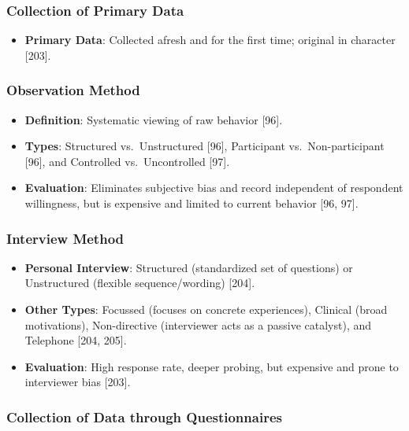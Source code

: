 \documentclass[
]{article}
\providecommand{\tightlist}{%
  \setlength{\itemsep}{0pt}\setlength{\parskip}{0pt}}
\begin{document}
\subsubsection{Collection of Primary
Data}\label{collection-of-primary-data}

\begin{itemize}
\tightlist
\item
  \textbf{Primary Data}: Collected afresh and for the first time;
  original in character {[}203{]}.
\end{itemize}

\subsubsection{Observation Method}\label{observation-method}

\begin{itemize}
\tightlist
\item
  \textbf{Definition}: Systematic viewing of raw behavior {[}96{]}.
\item
  \textbf{Types}: Structured vs.~Unstructured {[}96{]}, Participant
  vs.~Non-participant {[}96{]}, and Controlled vs.~Uncontrolled
  {[}97{]}.
\item
  \textbf{Evaluation}: Eliminates subjective bias and record independent
  of respondent willingness, but is expensive and limited to current
  behavior {[}96, 97{]}.
\end{itemize}

\subsubsection{Interview Method}\label{interview-method}

\begin{itemize}
\tightlist
\item
  \textbf{Personal Interview}: Structured (standardized set of
  questions) or Unstructured (flexible sequence/wording) {[}204{]}.
\item
  \textbf{Other Types}: Focussed (focuses on concrete experiences),
  Clinical (broad motivations), Non-directive (interviewer acts as a
  passive catalyst), and Telephone {[}204, 205{]}.
\item
  \textbf{Evaluation}: High response rate, deeper probing, but expensive
  and prone to interviewer bias {[}203{]}.
\end{itemize}

\subsubsection{Collection of Data through
Questionnaires}\label{collection-of-data-through-questionnaires}
\end{document}
